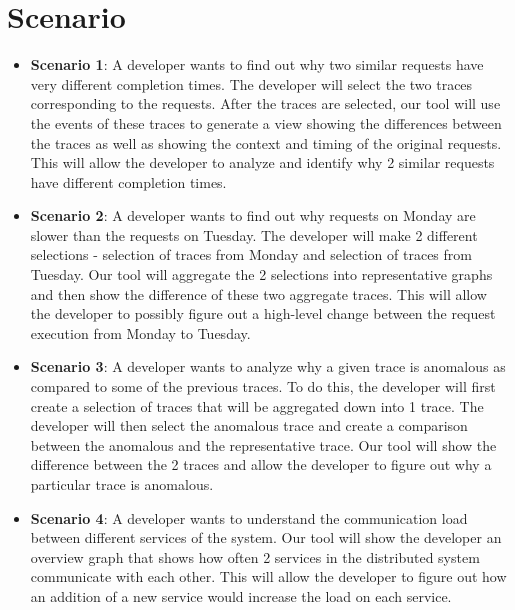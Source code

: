 \section{Scenario}

\begin{itemize}
\item \textbf{Scenario 1}: A developer wants to find out why two similar requests have very different 
completion times. The developer will select the two traces corresponding to the requests. After the traces are selected, our tool will
use the events of these traces to generate a view showing the differences between the traces as well as showing the
context and timing of the original requests. This will allow the developer to analyze and identify why 2 similar requests have 
different completion times.

\item \textbf{Scenario 2}: A developer wants to find out why requests on Monday are
slower than the requests on Tuesday. The developer will make 2 different selections - selection of traces from Monday and selection
of traces from Tuesday. Our tool will aggregate the 2 selections into representative graphs and then show the difference of these
two aggregate traces. This will allow the developer to possibly figure out a high-level change between the request execution from
Monday to Tuesday.

\item \textbf{Scenario 3}: A developer wants to analyze why a given trace is anomalous as compared to some of the previous
traces. To do this, the developer will first create a selection of traces that will be aggregated down into 1 trace. The developer
will then select the anomalous trace and create a comparison between the anomalous and the representative trace.
Our tool will show the difference between the 2 traces and allow the developer to figure out why a particular trace is anomalous.

\item \textbf{Scenario 4}: A developer wants to understand the communication load between different services of the system.
Our tool will show the developer an overview graph that shows how often 2 services in the distributed system communicate
with each other. This will allow the developer to figure out how an addition of a new service would increase the load on each
service.

\end{itemize}